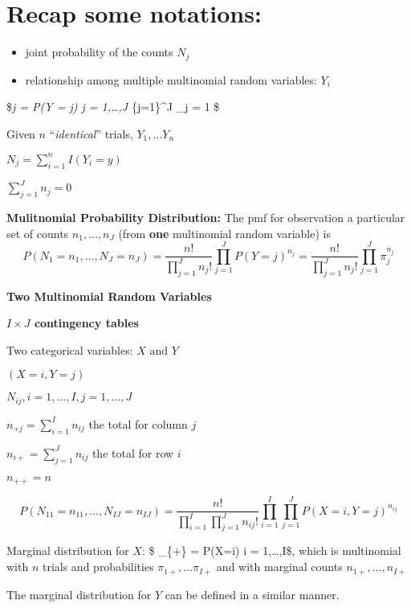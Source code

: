 \documentclass[]{article}
\begin{document}
\newpage

\section{Recap some notations:}\label{recap-some-notations}

\begin{itemize}
\item
  joint probability of the counts \(N_j\)
\item
  relationship among multiple multinomial random variables: \(Y_i\)
\end{itemize}

\$\pi\emph{j = P(Y = j)  j = 1,\dots,J 
\sum}\{j=1\}\^{}J \pi\_j = 1 \$

Given \(n\) ``\emph{identical}'' trials, \(Y_1, \dots Y_n\)

\(N_j = \sum_{i=1}^n I(Y_i = y)\)

\(\sum_{j=1}^J n_j= 0\)

\textbf{Mulitnomial Probability Distribution:} The pmf for observation a
particular set of counts \(n_1,\dots,n_J\) (from \textbf{one}
multinomial random variable) is \[
P(N_1 = n_1, \dots, N_J = n_J) = \frac{n!}{\prod_{j=1}^J n_j!}\prod_{j=1}^J P(Y=j)^{n_j} = \frac{n!}{\prod_{j=1}^J n_j!}\prod_{j=1}^J \pi_j^{n_j}
\]

\textbf{Two Multinomial Random Variables}

\textbf{\(I \times J\) contingency tables}

Two categorical variables: \(X \text{ and } Y\)

\((X=i,Y=j)\)

\(N_{ij}, i=1,\dots,I, j=1,\dots,J\)

\(n_{+j} = \sum_{i=1}^I n_{ij}\) the total for column \(j\)

\(n_{i+} = \sum_{j=1}^J n_{ij}\) the total for row \(i\)

\(n_{++} = n\)

\[
P(N_{11} = n_{11}, \dots, N_{IJ} = n_{IJ}) =
\frac{n!}{\prod_{i=1}^I \prod_{j=1}^J n_{ij}!} \prod_{i=1}^I \prod_{j=1}^J P(X=i, Y=j)^{n_{ij}}
\]

Marginal distribution for \(X\): \$ \pi\_\{+\} = P(X=i)  i =
1,\dots,I\$, which is multinomial with \(n\) trials and probabilities
\(\pi_{1+},\dots\pi_{I+}\) and with marginal counts
\(n_{1+},\dots, n_{I+}\)

The marginal distribution for \(Y\) can be defined in a similar manner.
\end{document}
